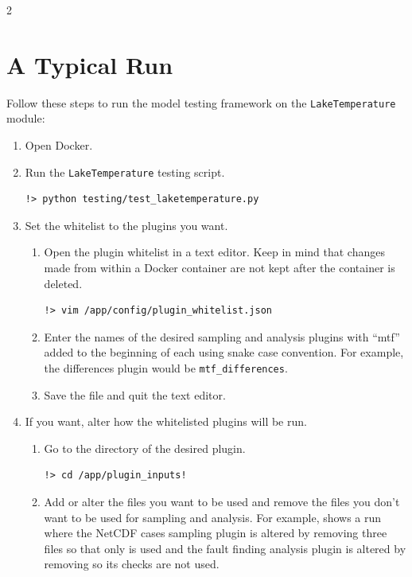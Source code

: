 \documentclass[10pt]{article}
\begin{document}
\begin{multicols}{2}
\section{A Typical Run}
Follow these steps to run the model testing framework on the \verb|LakeTemperature| module:
\begin{enumerate}
    \item Open Docker.
    
    \item Run the \verb|LakeTemperature| testing script.
\begin{lstlisting}[style=dawn]
!> python testing/test_laketemperature.py
\end{lstlisting}

    \item Set the whitelist to the plugins you want.
    \begin{enumerate}
        \item Open the plugin whitelist in a text editor. Keep in mind that changes made from within a Docker container are not kept after the container is deleted. 
\begin{lstlisting}[style=dawn]
!> vim /app/config/plugin_whitelist.json
\end{lstlisting}
        \item Enter the names of the desired sampling and analysis plugins with ``mtf'' added to the beginning of each using snake case convention. For example, the differences plugin would be \verb|mtf_differences|.
        \item Save the file and quit the text editor. 
    \end{enumerate}

    \item If you want, alter how the whitelisted plugins will be run. 
    \begin{enumerate}
        \item Go to the directory of the desired plugin.
\begin{lstlisting}[style=dawn]
!> cd /app/plugin_inputs!
\end{lstlisting}
        \item Add or alter the files you want to be used and remove the files you don't want to be used for sampling and analysis. For example,  shows a run where the NetCDF cases sampling plugin is altered by removing three files so that only  is used and the fault finding analysis plugin is altered by removing  so its checks are not used.
    \end{enumerate}
    

\end{enumerate}
\end{multicols}
\end{document}
